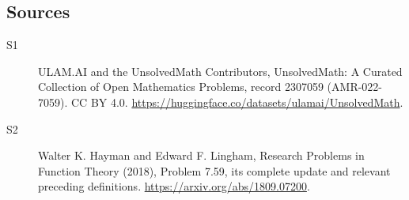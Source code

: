 \documentclass[11pt]{article}
\begin{document}
\subsection{Sources}
\begin{description}
\item[\hypertarget{source:2307059:1}{S1}] ULAM.AI and the UnsolvedMath Contributors, UnsolvedMath: A Curated Collection of Open Mathematics Problems, record 2307059 (AMR-022-7059). CC BY 4.0. \url{https://huggingface.co/datasets/ulamai/UnsolvedMath}.
\item[\hypertarget{source:2307059:2}{S2}] Walter K. Hayman and Edward F. Lingham, Research Problems in Function Theory (2018), Problem 7.59, its complete update and relevant preceding definitions. \url{https://arxiv.org/abs/1809.07200}.
\end{description}
\label{end:2307059}
\end{document}
